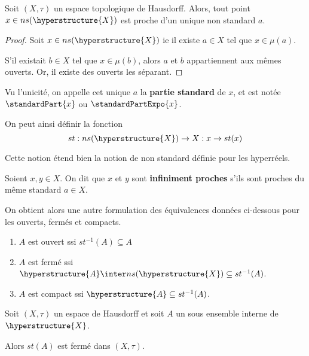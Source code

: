 \documentclass[a4paper, 12pt]{report}
\begin{document}
\begin{proposition}
	Soit $(X, \tau)$ un espace topologique de Hausdorff. Alors, tout point $x
	\in ns(\hyperstructure{X})$ est proche d'un unique non standard $a$.
\end{proposition}

\ifdefined\outputproof
\begin{proof}
	Soit $x \in ns(\hyperstructure{X})$ ie il existe $a \in X$ tel que $x \in
	\mu(a)$.

	S'il existait $b \in X$ tel que $x \in \mu(b)$, alors $a$ et $b$
	appartiennent aux mêmes ouverts. Or, il existe des ouverts les séparant.
\end{proof}
\fi

Vu l'unicité, on appelle cet unique $a$ la \textbf{partie
standard} de $x$, et est notée $\standardPart{x}$ ou $\standardPartExpo{x}$.

On peut ainsi définir la fonction
\begin{equation}
	st : ns(\hyperstructure{X}) \rightarrow X : x \rightarrow st(x)
\end{equation}

Cette notion étend bien la notion de non standard définie pour les hyperréels.

\begin{definition}
	Soient $x, y \in X$. On dit que $x$ et $y$ sont \textbf{infiniment proches}
	s'ils sont proches du même standard $a \in X$.
\end{definition}

On obtient alors une autre formulation des équivalences données ci-dessous pour
les ouverts, fermés et compacts.

\begin{enumerate}
	\item $A$ est ouvert ssi $st^{-1}(A) \subseteq A$
	\item $A$ est fermé ssi $\hyperstructure{A} \inter ns(\hyperstructure{X})
		\subseteq st^{-1}(A)$.
	\item $A$ est compact ssi $\hyperstructure{A} \subseteq st^{-1}(A)$.
\end{enumerate}

\begin{proposition}
	Soit $(X, \tau)$ un espace de Hausdorff et soit $A$ un sous ensemble interne
	de $\hyperstructure{X}$.

	Alors $st(A)$ est fermé dans $(X, \tau)$.
\end{proposition}
\end{document}
